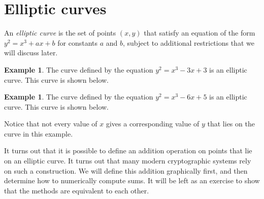 \documentclass{book}
\theoremstyle{plain}
\theoremstyle{definition}
\newtheorem{example}[theorem]{Example}
\begin{document}
\section{Elliptic curves}
An {\it elliptic curve} is the set of points $(x,y)$ that satisfy an equation of the form $y^2 = x^3 + ax + b$ for constants $a$ and $b$, subject to additional restrictions that we will discuss later.

\begin{example}
The curve defined by the equation $y^2 = x^3 - 3x + 3$ is an elliptic curve. This curve is shown below.

\begin{center}
\end{center}
\end{example}

\begin{example}
The curve defined by the equation $y^2 = x^3 - 6x + 5$ is an elliptic curve. This curve is shown below.

\begin{center}
\end{center}
\end{example}

Notice that not every value of $x$ gives a corresponding value of $y$ that lies on the curve in this example.

It turns out that it is possible to define an addition operation on points that lie on an elliptic curve. It turns out that many modern cryptographic systems rely on such a construction. We will define this addition graphically first, and then determine how to numerically compute sums. It will be left as an exercise to show that the methods are equivalent to each other.
\end{document}
